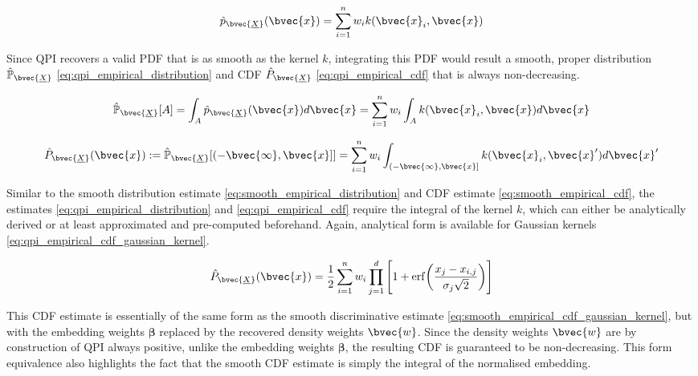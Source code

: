 \documentclass[twoside]{article} \usepackage{aistats2017}
\newcommand{\rv}[1]{\underline{#1}}
\newcommand{\qpi}{QPI }
\begin{document}
	\begin{equation}
		\hat{p}_{\bvec{\rv{X}}}(\bvec{x}) = \sum_{i = 1}^{n} w_{i} k(\bvec{x}_{i}, \bvec{x})
	\label{eq:qpi}
	\end{equation}

	Since \qpi recovers a valid PDF that is as smooth as the kernel $k$, integrating this PDF would result a smooth, proper distribution $\hat{\mathbb{P}}_{\bvec{\rv{X}}}$ \eqref{eq:qpi_empirical_distribution} and CDF $\hat{P}_{\bvec{\rv{X}}}$ \eqref{eq:qpi_empirical_cdf} that is always non-decreasing.
	
	\begin{equation}
		\hat{\mathbb{P}}_{\bvec{\rv{X}}}[A] = \int_{A} \hat{p}_{\bvec{\rv{X}}}(\bvec{x}) d\bvec{x} = \sum_{i = 1}^{n} w_{i} \int_{A} k(\bvec{x}_{i}, \bvec{x}) d\bvec{x}
	\label{eq:qpi_empirical_distribution}
	\end{equation}
	
	\begin{equation}
		\hat{P}_{\bvec{\rv{X}}}(\bvec{x}) := \hat{\mathbb{P}}_{\bvec{\rv{X}}}[(-\bvec{\infty}, \bvec{x}]] = \sum_{i = 1}^{n} w_{i} \int_{(-\bvec{\infty}, \bvec{x}]} k(\bvec{x}_{i}, \bvec{x}') d\bvec{x}'
	\label{eq:qpi_empirical_cdf}
	\end{equation}
	
	Similar to the smooth distribution estimate \eqref{eq:smooth_empirical_distribution} and CDF estimate \eqref{eq:smooth_empirical_cdf}, the estimates \eqref{eq:qpi_empirical_distribution} and \eqref{eq:qpi_empirical_cdf} require the integral of the kernel $k$, which can either be analytically derived or at least approximated and pre-computed beforehand. Again, analytical form is available for Gaussian kernels \eqref{eq:qpi_empirical_cdf_gaussian_kernel}.
	
	\begin{equation}
		\hat{P}_{\bvec{\rv{X}}}(\bvec{x}) = \frac{1}{2} \sum_{i = 1}^{n} w_{i} \prod_{j = 1}^{d} \Bigg[1 + \mathrm{erf}\bigg(\frac{x_{j} - x_{i, j}}{\sigma_{j} \sqrt{2}}\bigg)\Bigg]
	\label{eq:qpi_empirical_cdf_gaussian_kernel}
	\end{equation}
	
	This CDF estimate is essentially of the same form as the smooth discriminative estimate \eqref{eq:smooth_empirical_cdf_gaussian_kernel}, but with the embedding weights $\bm{\beta}$ replaced by the recovered density weights $\bvec{w}$. Since the density weights $\bvec{w}$ are by construction of \qpi always positive, unlike the embedding weights $\bm{\beta}$, the resulting CDF is guaranteed to be non-decreasing. This form equivalence also highlights the fact that the smooth CDF estimate is simply the integral of the normalised embedding.
	
\end{document}

